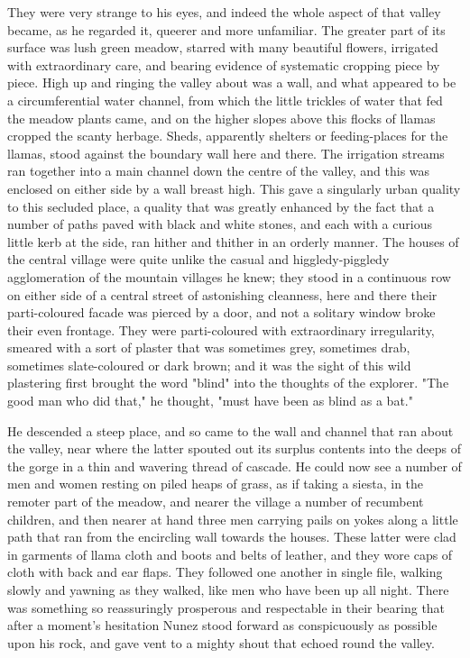 \documentclass[courier]{sffms}
\begin{document}
They were very strange to his eyes, and indeed the whole aspect of
that valley became, as he regarded it, queerer and more
unfamiliar. The greater part of its surface was lush green meadow,
starred with many beautiful flowers, irrigated with extraordinary
care, and bearing evidence of systematic cropping piece by piece. High
up and ringing the valley about was a wall, and what appeared to be a
circumferential water channel, from which the little trickles of water
that fed the meadow plants came, and on the higher slopes above this
flocks of llamas cropped the scanty herbage. Sheds, apparently
shelters or feeding-places for the llamas, stood against the boundary
wall here and there. The irrigation streams ran together into a main
channel down the centre of the valley, and this was enclosed on either
side by a wall breast high. This gave a singularly urban quality to
this secluded place, a quality that was greatly enhanced by the fact
that a number of paths paved with black and white stones, and each
with a curious little kerb at the side, ran hither and thither in an
orderly manner.  The houses of the central village were quite unlike
the casual and higgledy-piggledy agglomeration of the mountain
villages he knew; they stood in a continuous row on either side of a
central street of astonishing cleanness, here and there their
parti-coloured facade was pierced by a door, and not a solitary window
broke their even frontage. They were parti-coloured with extraordinary
irregularity, smeared with a sort of plaster that was sometimes grey,
sometimes drab, sometimes slate-coloured or dark brown; and it was the
sight of this wild plastering first brought the word "blind" into the
thoughts of the explorer. "The good man who did that," he thought,
"must have been as blind as a bat."

He descended a steep place, and so came to the wall and channel that
ran about the valley, near where the latter spouted out its surplus
contents into the deeps of the gorge in a thin and wavering thread of
cascade. He could now see a number of men and women resting on piled
heaps of grass, as if taking a siesta, in the remoter part of the
meadow, and nearer the village a number of recumbent children, and
then nearer at hand three men carrying pails on yokes along a little
path that ran from the encircling wall towards the houses. These
latter were clad in garments of llama cloth and boots and belts of
leather, and they wore caps of cloth with back and ear flaps. They
followed one another in single file, walking slowly and yawning as
they walked, like men who have been up all night. There was something
so reassuringly prosperous and respectable in their bearing that after
a moment's hesitation Nunez stood forward as conspicuously as possible
upon his rock, and gave vent to a mighty shout that echoed round the
valley.
\end{document}
